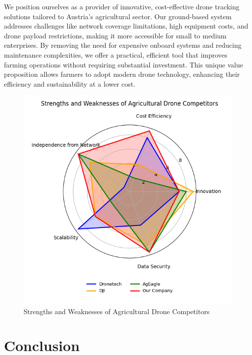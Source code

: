 We position ourselves as a provider of innovative, cost-effective drone tracking solutions tailored to Austria's agricultural sector. Our ground-based system addresses challenges like network coverage limitations, high equipment costs, and drone payload restrictions, making it more accessible for small to medium enterprises. By removing the need for expensive onboard systems and reducing maintenance complexities, we offer a practical, efficient tool that improves farming operations without requiring substantial investment. This unique value proposition allows farmers to adopt modern drone technology, enhancing their efficiency and sustainability at a lower cost.

\begin{figure}
	[H] 
	\centering 
	\hspace*{-1.5cm} 
	\includegraphics[width=400pt]{figures/competitors.png} 
	\caption{Strengths and Weaknesses of Agricultural Drone Competitors} 
	\label{image} 
\end{figure}

\section{Conclusion}

